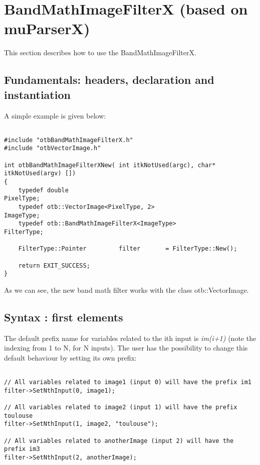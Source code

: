 \newpage
\section{BandMathImageFilterX (based on muParserX)}\label{sec:bandmathx}
This section describes how to use the BandMathImageFilterX.


\subsection{Fundamentals: headers, declaration and instantiation}\label{ssec:fund}

A simple example is given below:

\begin{verbatim}

#include "otbBandMathImageFilterX.h"
#include "otbVectorImage.h"

int otbBandMathImageFilterXNew( int itkNotUsed(argc), char* itkNotUsed(argv) [])
{
  	typedef double                                            			PixelType;
  	typedef otb::VectorImage<PixelType, 2>                     	ImageType;
  	typedef otb::BandMathImageFilterX<ImageType>                FilterType;

   	FilterType::Pointer         filter       = FilterType::New();

   	return EXIT_SUCCESS;
}

\end{verbatim}

As we can see, the new band math filter works with the class otb::VectorImage.

\subsection{Syntax : first elements}\label{ssec:syntax}

The default prefix name for variables related to the ith input is \textit{im(i+1)} (note the indexing from 1 to N, for N inputs). The user has the possibility to change this default behaviour by setting its own prefix:

\begin{verbatim}

// All variables related to image1 (input 0) will have the prefix im1 
filter->SetNthInput(0, image1);   		

// All variables related to image2 (input 1) will have the prefix  toulouse   
filter->SetNthInput(1, image2, "toulouse");   

// All variables related to anotherImage (input 2) will have the prefix im3
filter->SetNthInput(2, anotherImage); 	   

\end{verbatim}

